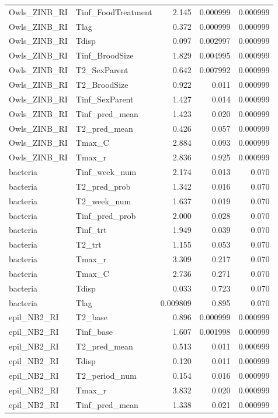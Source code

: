 \begin{landscape}
\begin{center}
\begin{longtable}{llrrr}
Owls\_ZINB\_RI & Tinf\_FoodTreatment & 2.145 & 0.000999 & 0.000999 \\
Owls\_ZINB\_RI & Tlag & 0.372 & 0.000999 & 0.000999 \\
Owls\_ZINB\_RI & Tdisp & 0.097 & 0.002997 & 0.000999 \\
Owls\_ZINB\_RI & Tinf\_BroodSize & 1.829 & 0.004995 & 0.000999 \\
Owls\_ZINB\_RI & T2\_SexParent & 0.642 & 0.007992 & 0.000999 \\
Owls\_ZINB\_RI & T2\_BroodSize & 0.922 & 0.011 & 0.000999 \\
Owls\_ZINB\_RI & Tinf\_SexParent & 1.427 & 0.014 & 0.000999 \\
Owls\_ZINB\_RI & Tinf\_pred\_mean & 1.423 & 0.020 & 0.000999 \\
Owls\_ZINB\_RI & T2\_pred\_mean & 0.426 & 0.057 & 0.000999 \\
Owls\_ZINB\_RI & Tmax\_C & 2.884 & 0.093 & 0.000999 \\
Owls\_ZINB\_RI & Tmax\_r & 2.836 & 0.925 & 0.000999 \\
bacteria & Tinf\_week\_num & 2.174 & 0.013 & 0.070 \\
bacteria & T2\_pred\_prob & 1.342 & 0.016 & 0.070 \\
bacteria & T2\_week\_num & 1.637 & 0.019 & 0.070 \\
bacteria & Tinf\_pred\_prob & 2.000 & 0.028 & 0.070 \\
bacteria & Tinf\_trt & 1.949 & 0.039 & 0.070 \\
bacteria & T2\_trt & 1.155 & 0.053 & 0.070 \\
bacteria & Tmax\_r & 3.309 & 0.217 & 0.070 \\
bacteria & Tmax\_C & 2.736 & 0.271 & 0.070 \\
bacteria & Tdisp & 0.033 & 0.723 & 0.070 \\
bacteria & Tlag & 0.009809 & 0.895 & 0.070 \\
epil\_NB2\_RI & T2\_base & 0.896 & 0.000999 & 0.000999 \\
epil\_NB2\_RI & Tinf\_base & 1.607 & 0.001998 & 0.000999 \\
epil\_NB2\_RI & T2\_pred\_mean & 0.513 & 0.011 & 0.000999 \\
epil\_NB2\_RI & Tdisp & 0.120 & 0.011 & 0.000999 \\
epil\_NB2\_RI & T2\_period\_num & 0.154 & 0.016 & 0.000999 \\
epil\_NB2\_RI & Tmax\_r & 3.832 & 0.020 & 0.000999 \\
epil\_NB2\_RI & Tinf\_pred\_mean & 1.338 & 0.021 & 0.000999 \\

\end{longtable}
\end{center}
\end{landscape}
